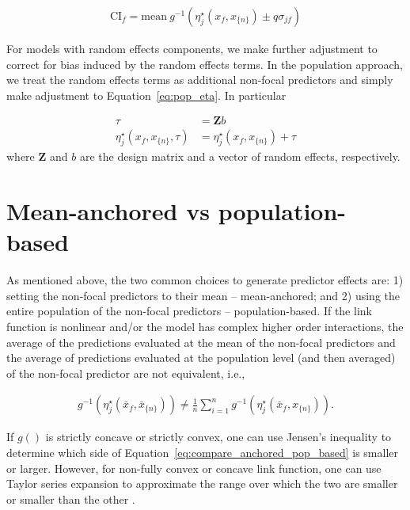 \documentclass[10pt,letterpaper]{article}
\newcommand{\bZ}{{\mathbf Z}}
\newcommand{\nset}[1]{#1_{\{n\}}}
\begin{document}
\begin{align}
\mathrm{CI}_f = \mathrm{mean} ~ g^{-1} \left(\eta_j^\star(x_f, \nset{x}) \pm q\sigma_{jf}\right)
\end{align}

For models with random effects components, we make further adjustment to correct for bias induced by the random effects terms. In the population approach, we treat the random effects terms as additional non-focal predictors and simply make adjustment to Equation~\ref{eq:pop_eta}. In particular

\begin{align}\label{eq:pop_eta_re} 
\tau &= \bZ b \nonumber \\
\eta_j^\star(x_f, \nset{x}, \tau)  &= \eta_j^\star(x_f, \nset{x}) + \tau
\end{align}
where $\bZ$ and $b$ are the design matrix and a vector of random effects, respectively.

\section*{Mean-anchored vs population-based}

As mentioned above, the two common choices to generate predictor effects are: 1) setting the non-focal predictors to their mean -- mean-anchored; and 2) using the entire population of the non-focal predictors -- population-based. If the link function is nonlinear and/or the model has complex higher order interactions, the average of the predictions evaluated at the mean of the non-focal predictors and the average of predictions evaluated at the population level (and then averaged) of the non-focal predictor are not equivalent, i.e.,

\begin{align}\label{eq:compare_anchored_pop_based}
g^{-1} \left(\eta_j^\star(\bar{x}_f, \nset{\bar{x}})\right) \neq \frac{1}{n} \sum_{i=1}^n{ g^{-1} \left(\eta_j^\star(\bar{x}_f, \nset{x})\right)}.
\end{align}

If $g()$ is strictly concave or strictly convex, one can use Jensen's inequality to determine which side of Equation~\ref{eq:compare_anchored_pop_based} is smaller or larger. However, for non-fully convex or concave link function, one can use Taylor series expansion to approximate the range over which the two are smaller or smaller than the other \cite{hanmer2013behind}. 
\end{document}
